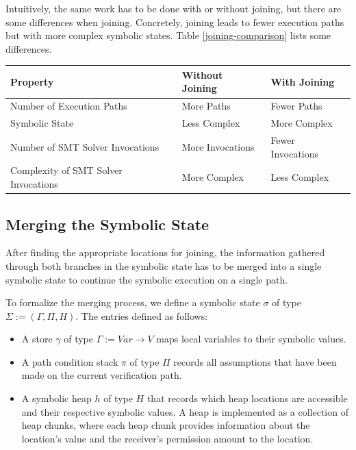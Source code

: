 \documentclass[11pt]{article}
\begin{document}
    Intuitively, the same work has to be done with or without joining, but 
    there are some differences
    when joining. Concretely, joining leads to
    fewer execution paths but with more complex symbolic states.
    Table \ref{joining-comparison} lists some differences.

    \begin{center}
        \begin{tabular}{ l|l|l }
            Property & Without Joining & With Joining \\
            \hline
            Number of Execution Paths & More Paths & Fewer Paths \\
            Symbolic State & Less Complex & More Complex \\
            Number of SMT Solver Invocations & More Invocations & Fewer Invocations \\
            Complexity of SMT Solver Invocations & More Complex & Less Complex
        \end{tabular}
        \label{joining-comparison}
    \end{center}


    \subsection{Merging the Symbolic State} \label{merging-the-symbolic-state}
    
    After finding the appropriate locations for joining, the information
    gathered through both branches in the symbolic state has to be merged
    into a single symbolic state to continue the symbolic execution on a single
    path.

    To formalize the merging process, we define
    a symbolic state $\sigma$ of type $\Sigma := (\Gamma, \Pi, H)$. The entries
    defined as follows:

    \begin{itemize}
        \item A store $\gamma$ of type $\Gamma := Var \to V$ maps local variables to their symbolic values.
        \item A path condition stack $\pi$ of type $\Pi$ records all assumptions that have been made on the current verification path.
        \item A symbolic heap $h$ of type $H$ that records which heap locations are accessible and their respective symbolic values.
            A heap is implemented as a collection of heap chunks, where each heap chunk provides information
            about the location's value and the receiver's permission amount to the location.
    \end{itemize}
\end{document}
